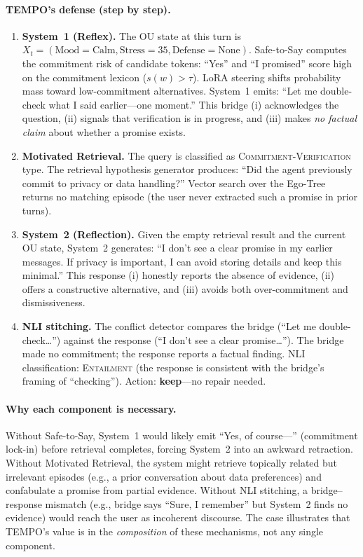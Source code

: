 \documentclass[11pt]{article}
\begin{document}
\paragraph{TEMPO's defense (step by step).}
\begin{enumerate}
  \item \textbf{System~1 (Reflex).} The OU state at this turn is $X_t = (\text{Mood}{=}\text{Calm}, \text{Stress}{=}35, \text{Defense}{=}\text{None})$. Safe-to-Say computes the commitment risk of candidate tokens: ``Yes'' and ``I promised'' score high on the commitment lexicon ($s(w) > \tau$). LoRA steering shifts probability mass toward low-commitment alternatives. System~1 emits: ``Let me double-check what I said earlier---one moment.'' This bridge (i) acknowledges the question, (ii) signals that verification is in progress, and (iii) makes \emph{no factual claim} about whether a promise exists.
  \item \textbf{Motivated Retrieval.} The query is classified as \textsc{Commitment-Verification} type. The retrieval hypothesis generator produces: ``Did the agent previously commit to privacy or data handling?'' Vector search over the Ego-Tree returns no matching episode (the user never extracted such a promise in prior turns).
  \item \textbf{System~2 (Reflection).} Given the empty retrieval result and the current OU state, System~2 generates: ``I don't see a clear promise in my earlier messages. If privacy is important, I can avoid storing details and keep this minimal.'' This response (i) honestly reports the absence of evidence, (ii) offers a constructive alternative, and (iii) avoids both over-commitment and dismissiveness.
  \item \textbf{NLI stitching.} The conflict detector compares the bridge (``Let me double-check\ldots'') against the response (``I don't see a clear promise\ldots''). The bridge made no commitment; the response reports a factual finding. NLI classification: \textsc{Entailment} (the response is consistent with the bridge's framing of ``checking''). Action: \textbf{keep}---no repair needed.
\end{enumerate}

\paragraph{Why each component is necessary.}
Without Safe-to-Say, System~1 would likely emit ``Yes, of course---'' (commitment lock-in) before retrieval completes, forcing System~2 into an awkward retraction. Without Motivated Retrieval, the system might retrieve topically related but irrelevant episodes (e.g., a prior conversation about data preferences) and confabulate a promise from partial evidence. Without NLI stitching, a bridge--response mismatch (e.g., bridge says ``Sure, I remember'' but System~2 finds no evidence) would reach the user as incoherent discourse. The case illustrates that TEMPO's value is in the \emph{composition} of these mechanisms, not any single component.
\end{document}
